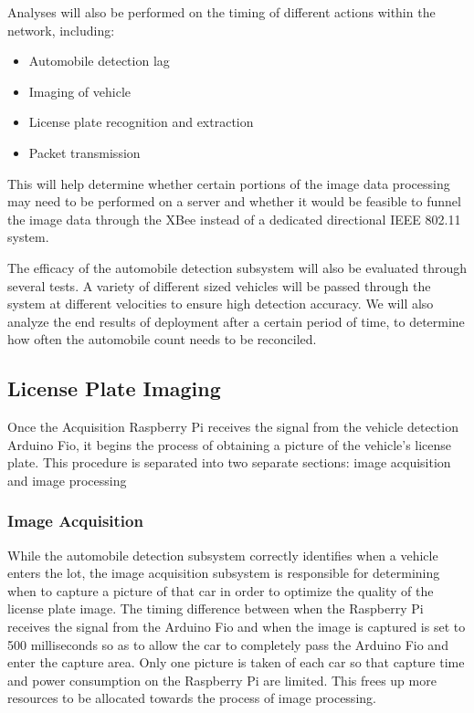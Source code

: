 \documentclass[11pt, oneside, fullpage, doublespace]{article}
\begin{document}
Analyses will also be performed on the timing of different actions within the network, including:
\begin{itemize}
\item Automobile detection lag
\item Imaging of vehicle
\item License plate recognition and extraction
\item Packet transmission
\end{itemize}
This will help determine whether certain portions of the image data processing may need to be performed on a server and whether it would be feasible to funnel the image data through the XBee instead of a dedicated directional IEEE 802.11 system.

The efficacy of the automobile detection subsystem will also be evaluated through several tests. A variety of different sized vehicles will be passed through the system at different velocities to ensure high detection accuracy. We will also analyze the end results of deployment after a certain period of time, to determine how often the automobile count needs to be reconciled.


\subsection{License Plate Imaging}
Once the Acquisition Raspberry Pi receives the signal from the vehicle detection Arduino Fio, it begins the process of obtaining a picture of the vehicle's license plate. This procedure is separated into two separate sections: image acquisition and image processing

\subsubsection{Image Acquisition}
While the automobile detection subsystem correctly identifies when a vehicle enters the lot, the image acquisition subsystem is responsible for determining when to capture a picture of that car in order to optimize the quality of the license plate image. The timing difference between when the Raspberry Pi receives the signal from the Arduino Fio and when the image is captured is set to 500 milliseconds so as to allow the car to completely pass the Arduino Fio and enter the capture area. Only one picture is taken of each car so that capture time and power consumption on the Raspberry Pi are limited. This frees up more resources to be allocated towards the process of image processing.
\end{document}
